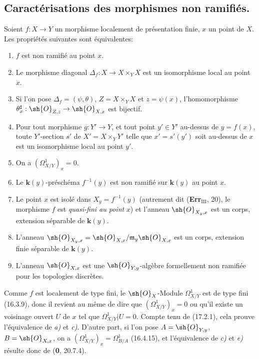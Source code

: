 
\subsection{Caractérisations des morphismes non ramifiés.}

\begin{theorem}[17.4.1]
\label{IV.17.4.1}
Soient $f:X\to Y$ un morphisme localement de présentation finie, $x$ un point de $X$. Les propriétés suivantes sont équivalentes:
\begin{enumerate}
  \item[\textup{a)}] $f$ est non ramifié au point $x$.
  \item[\textup{b)}] Le morphisme diagonal $\Delta_f:X\to X\times_Y X$ est un isomorphisme local au point $x$.
  \item[\textup{b$'$)}] Si l'on pose $\Delta_f=(\psi,\theta)$, $Z=X\times_Y X$ et $z=\psi(x)$, l'homomorphisme $\theta_x^\sharp:\sh{O}_{Z,z}\to\sh{O}_{X,x}$ est bijectif.
  \item[\textup{b$''$)}] Pour tout morphisme $g:Y'\to Y$, et tout point $y'\in Y'$ au-dessus de $y=f(x)$, toute $Y'$-section $s'$ de $X'=X\times_Y Y'$ telle que $x'=s'(y')$ soit au-dessus de $x$ est un isomorphisme local au point $y'$.
  \item[\textup{c)}] On a $(\varOmega^1_{X/Y})_x=0$.
  \item[\textup{d)}] Le $\boldsymbol{k}(y)$-préschéma $f^{-1}(y)$ est non ramifié sur $\boldsymbol{k}(y)$ au point $x$.
  \item[\textup{d$'$)}] Le point $x$ est isolé dans $X_y=f^{-1}(y)$ \textup{(autrement dit (\textbf{Err}$_{\mathrm{III}}$, 20), le morphisme $f$ est \emph{quasi-fini au point} $x$)} et l'anneau $\sh{O}_{X_y,x}$ est un corps, extension séparable de $\boldsymbol{k}(y)$.
  \item[\textup{d$''$)}] L'anneau $\sh{O}_{X_y,x}=\sh{O}_{X,x}/\mathfrak{m}_y\sh{O}_{X,x}$ est un corps, extension finie séparable de $\boldsymbol{k}(y)$.
  \item[\textup{e)}] L'anneau $\sh{O}_{X,x}$ est une $\sh{O}_{Y,y}$-algèbre formellement non ramifiée pour les topologies discrètes.
\end{enumerate}
\end{theorem}

Comme $f$ est localement de type fini, le $\sh{O}_X$-Module $\varOmega^1_{X/Y}$ est de type fini (16.3.9), donc il revient au même de dire que $(\varOmega^1_{X/Y})_x=0$ ou qu'il existe un voisinage ouvert $U$ de $x$ tel que $\varOmega^1_{X/Y}|U=0$. Compte tenu de (17.2.1), cela prouve l'équivalence de \emph{a)} et \emph{c)}. D'autre part, si l'on pose $A=\sh{O}_{Y,y}$, $B=\sh{O}_{X,x}$, on a $(\varOmega^1_{X/Y})_x=\Omega^1_{B/A}$ (16.4.15), et l'équivalence de \emph{c)} et \emph{e)} résulte donc de (\textbf{0}, 20.7.4).

